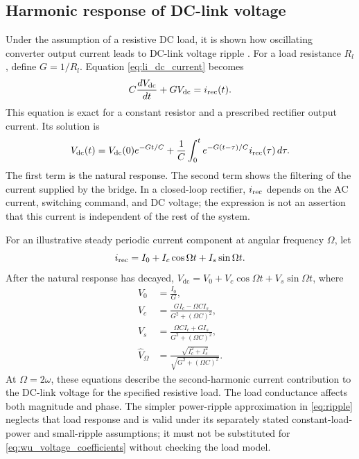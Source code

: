 \subsection{Harmonic response of DC-link voltage}
Under the assumption of a resistive DC load, it is shown how oscillating converter output current leads to DC-link voltage ripple \cite{wu2008}. For a load resistance \(R_l\), define \(G=1/R_l\). Equation \eqref{eq:li_dc_current} becomes
\begin{equation}\label{eq:wu_resistive_ode}
C\frac{dV_{\mathrm{dc}}}{dt}+GV_{\mathrm{dc}}=i_{\rm rec}(t).
\end{equation}
This equation is exact for a constant resistor and a prescribed rectifier output current. Its solution is
\begin{equation}\label{eq:wu_resistive_solution}
V_{\mathrm{dc}}(t)=V_{\mathrm{dc}}(0)e^{-Gt/C}
+\frac1C\int_0^t e^{-G(t-\tau)/C}i_{\rm rec}(\tau)\,d\tau .
\end{equation}
The first term is the natural response. The second term shows the filtering of the current supplied by the bridge. In a closed-loop rectifier, \(i_{\rm rec}\) depends on the AC current, switching command, and DC voltage; the expression is not an assertion that this current is independent of the rest of the system.

For an illustrative steady periodic current component at angular frequency \(\Omega\), let
\begin{equation}
i_{\rm rec}=I_0+I_c\cos\Omega t+I_s\sin\Omega t .
\end{equation}
After the natural response has decayed, \(V_{\mathrm{dc}}=V_0+V_c\cos\Omega t+V_s\sin\Omega t\), where
\begin{equation}\label{eq:wu_voltage_coefficients}
\begin{aligned}
V_0&=\frac{I_0}{G},\\
V_c&=\frac{GI_c-\Omega C I_s}{G^2+(\Omega C)^2},\\
V_s&=\frac{\Omega C I_c+GI_s}{G^2+(\Omega C)^2},\\
\widehat V_\Omega&=\frac{\sqrt{I_c^2+I_s^2}}{\sqrt{G^2+(\Omega C)^2}} .
\end{aligned}
\end{equation}
At \(\Omega=2\omega\), these equations describe the second-harmonic current contribution to the DC-link voltage for the specified resistive load. The load conductance affects both magnitude and phase. The simpler power-ripple approximation in \eqref{eq:ripple} neglects that load response and is valid under its separately stated constant-load-power and small-ripple assumptions; it must not be substituted for \eqref{eq:wu_voltage_coefficients} without checking the load model.

